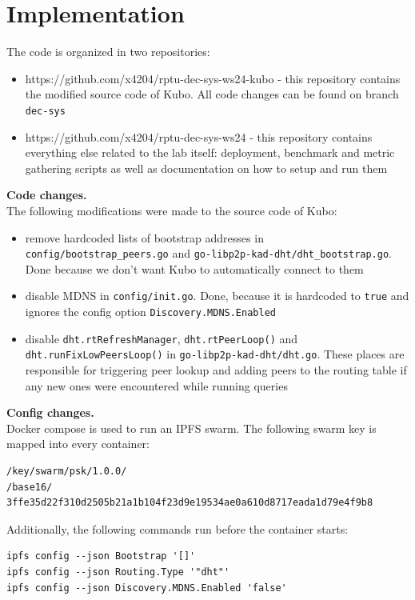 \section{Implementation}

The code is organized in two repositories:
\begin{itemize}
\item https://github.com/x4204/rptu-dec-sys-ws24-kubo - this repository
contains the modified source code of Kubo. All code changes can be found on
branch \verb|dec-sys|
\item https://github.com/x4204/rptu-dec-sys-ws24 - this repository contains
everything else related to the lab itself: deployment, benchmark and metric
gathering scripts as well as documentation on how to setup and run them
\end{itemize}

\textbf{Code changes.}\\
The following modifications were made to the source code of Kubo:
\begin{itemize}
\item remove hardcoded lists of bootstrap addresses in
\verb|config/bootstrap_peers.go| and \verb|go-libp2p-kad-dht/dht_bootstrap.go|.
Done because we don't want Kubo to automatically connect to them
\item disable MDNS in \verb|config/init.go|. Done, because it is hardcoded to
\verb|true| and ignores the config option \verb|Discovery.MDNS.Enabled|
\item disable \verb|dht.rtRefreshManager|, \verb|dht.rtPeerLoop()| and
\verb|dht.runFixLowPeersLoop()| in \verb|go-libp2p-kad-dht/dht.go|. These
places are responsible for triggering peer lookup and adding peers to the
routing table if any new ones were encountered while running queries
\end{itemize}

\textbf{Config changes.}\\
Docker compose is used to run an IPFS swarm. The following swarm key is mapped
into every container:
\begin{lstlisting}
/key/swarm/psk/1.0.0/
/base16/
3ffe35d22f310d2505b21a1b104f23d9e19534ae0a610d8717eada1d79e4f9b8
\end{lstlisting}

Additionally, the following commands run before the container starts:
\begin{lstlisting}
ipfs config --json Bootstrap '[]'
ipfs config --json Routing.Type '"dht"'
ipfs config --json Discovery.MDNS.Enabled 'false'
\end{lstlisting}

